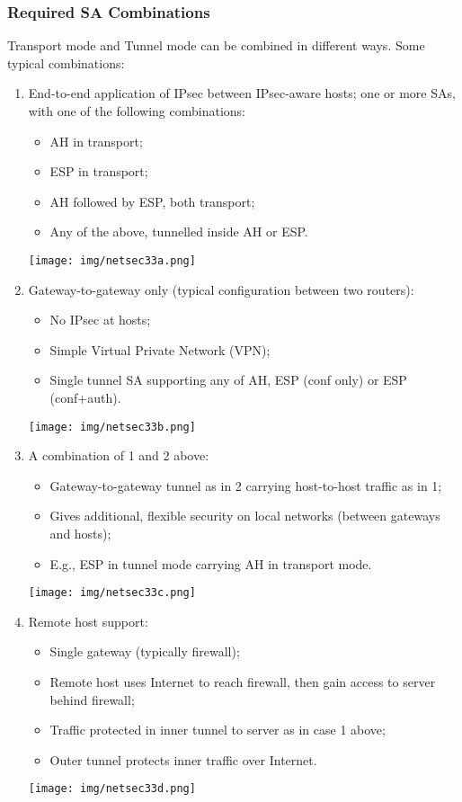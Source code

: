 \documentclass[a4paper, 10pt, titlepage]{article}
\begin{document}
\subsubsection*{Required SA Combinations}
Transport mode and Tunnel mode can be combined in different ways. Some typical combinations:
\begin{enumerate}
	\item End-to-end application of IPsec between IPsec-aware
	hosts; one or more SAs, with one of the following
	combinations:
	\begin{itemize}
		\item AH in transport;
		\item ESP in transport;
		\item AH followed by ESP, both transport;
		\item Any of the above, tunnelled inside AH or ESP.
	\end{itemize}
	\begin{center}
		\texttt{[image: img/netsec33a.png]}
	\end{center}
	\item Gateway-to-gateway only (typical configuration between two routers):
	\begin{itemize}
		\item No IPsec at hosts;
		\item Simple Virtual Private Network (VPN);
		\item Single tunnel SA supporting any of AH, ESP (conf only) or ESP (conf+auth).
	\end{itemize}
	\begin{center}
		\texttt{[image: img/netsec33b.png]}
	\end{center}
	\item A combination of 1 and 2 above:
	\begin{itemize}
		\item Gateway-to-gateway tunnel as in 2 carrying host-to-host traffic as in 1;
		\item Gives additional, flexible security on local networks (between gateways and hosts);
		\item E.g., ESP in tunnel mode carrying AH in transport mode.
	\end{itemize}
	\begin{center}
		\texttt{[image: img/netsec33c.png]}
	\end{center}
	\item Remote host support:
	\begin{itemize}
		\item Single gateway (typically firewall);
		\item Remote host uses Internet to reach firewall, then gain access to server behind firewall;
		\item Traffic protected in inner tunnel to server as in case 1 above;
		\item Outer tunnel protects inner traffic over Internet.
	\end{itemize}
	\begin{center}
		\texttt{[image: img/netsec33d.png]}
	\end{center}	
\end{enumerate}
\end{document}
